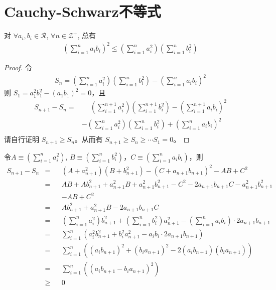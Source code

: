 \section{Cauchy-Schwarz不等式}
\label{sec:cauchy-schwarz-inequalities}

\begin{theorem}
对 $\forall a_i, b_i\in \mathcal{R}$, $\forall n\in\mathcal{Z}^+$, 总有
\begin{align}
  \left(\sum_{i=1}^{n} a_ib_i\right)^2 \le \left(\sum_{i=1}^{n}a_i^2\right) \left(\sum_{i=1}^{n}b_i^2\right)
\end{align}
\end{theorem}

\begin{proof}
  令
  \begin{align*}
    S_n = \left(\sum_{i=1}^{n}a_i^2\right) \left(\sum_{i=1}^{n}b_i^2\right) - \left(\sum_{i=1}^{n} a_ib_i\right)^2
  \end{align*}
  则 $S_1 = a_1^2b_1^2 - (a_1b_1)^2 = 0$，且
  \begin{align*}
    S_{n+1} - S_n =& \phantom{-} \left(\sum_{i=1}^{n+1}a_i^2\right) \left(\sum_{i=1}^{n+1}b_i^2\right) - \left(\sum_{i=1}^{n+1} a_ib_i\right)^2 \\
     &- \left(\sum_{i=1}^{n}a_i^2\right) \left(\sum_{i=1}^{n}b_i^2\right) + \left(\sum_{i=1}^{n} a_ib_i\right)^2\\
  \end{align*}
  请自行证明 $S_{n+1}\ge S_n$。从而有 $S_{n+1}\ge S_n\ge\cdots S_1 = 0$。
\end{proof}

\note 令$A\equiv\left(\sum_{i=1}^{n}a_i^2\right)$, $B\equiv\left(\sum_{i=1}^{n}b_i^2\right)$，$C\equiv\left(\sum_{i=1}^{n} a_ib_i\right)$，则
\begingroup\allowdisplaybreaks
\begin{align*}
  S_{n+1} - S_n &=&& (A+a_{n+1}^2)(B+b_{n+1}^2) - (C+a_{n+1}b_{n+1})^2 - AB + C^2\\
  &=&& AB + Ab_{n+1}^2 + a_{n+1}^2B + a_{n+1}^2b_{n+1}^2 - C^2 - 2a_{n+1}b_{n+1}C - a_{n+1}^2b_{n+1}^2\\
  &&&- AB + C^2\\
  &=&& Ab_{n+1}^2 + a_{n+1}^2B - 2a_{n+1}b_{n+1}C\\
  &=&& \left(\sum_{i=1}^{n}a_i^2\right) b_{n+1}^2 + \left(\sum_{i=1}^{n}b_i^2\right) a_{n+1}^2
       - \left(\sum_{i=1}^{n}a_ib_i\right) \cdot 2a_{n+1}b_{n+1}\\
  &=&& \sum_{i=1}^{n} \left( a_i^2b_{n+1}^2 + b_i^2a_{n+1}^2 - a_ib_i\cdot 2a_{n+1}b_{n+1} \right)\\
  &=&& \sum_{i=1}^{n} \left( (a_ib_{n+1})^2 + (b_ia_{n+1})^2 - 2(a_ib_{n+1})(b_ia_{n+1}) \right)\\
  &=&& \sum_{i=1}^{n} \left( (a_ib_{n+1} - b_ia_{n+1})^2 \right)\\
  &\ge&&0
\end{align*}
\endgroup


